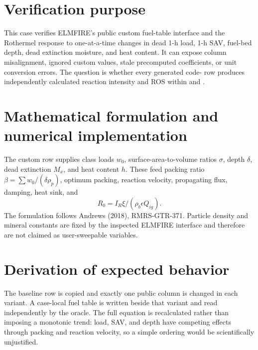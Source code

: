 \section{Verification purpose}
This case verifies ELMFIRE's public custom fuel-table interface and the Rothermel response to one-at-a-time changes in dead 1-h load, 1-h SAV, fuel-bed depth, dead extinction moisture, and heat content.  It can expose column misalignment, ignored custom values, stale precomputed coefficients, or unit conversion errors.  The question is whether every generated code-\CustomFuelCode{} row produces independently calculated reaction intensity and ROS within \IrTolerance{} and \RosTolerance{}.

\section{Mathematical formulation and numerical implementation}
The custom row supplies class loads $w_0$, surface-area-to-volume ratios $\sigma$, depth $\delta$, dead extinction $M_x$, and heat content $h$.  These feed packing ratio $\beta=\sum w_0/(\delta\rho_p)$, optimum packing, reaction velocity, propagating flux, damping, heat sink, and
\begin{equation}R_0=I_R\xi/(\rho_b\epsilon Q_{ig}).\end{equation}
The formulation follows Andrews (2018), RMRS-GTR-371.  Particle density and mineral constants are fixed by the inspected ELMFIRE interface and therefore are not claimed as user-sweepable variables.

\section{Derivation of expected behavior}
The baseline row is copied and exactly one public column is changed in each variant.  A case-local fuel table is written beside that variant and read independently by the oracle.  The full equation is recalculated rather than imposing a monotonic trend: load, SAV, and depth have competing effects through packing and reaction velocity, so a simple ordering would be scientifically unjustified.

